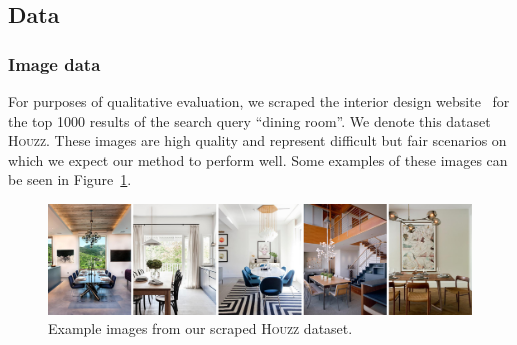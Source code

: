 \documentclass[10pt,twocolumn,letterpaper]{article}
\begin{document}
\begin{table}
    \centering
    \caption[Hyper parameters]{Hyper parameters of optimization, found by HyperOpt~\cite{HyperOpt}}
    \label{tab:ch4:hyperparameters}
\end{table}

\subsection{Data}
\label{sec:ch4:training_data}
\subsubsection{Image data}
For purposes of qualitative evaluation, we scraped the
interior design website~\cite{Houzz} for the top 1000 results of the search
query ``dining room''. We denote this dataset \textsc{Houzz}.  These images are
high quality and represent difficult but fair scenarios on which we expect our
method to perform well. Some examples of these images can be seen in
Figure~\ref{fig:ch4:houzz}.

\begin{figure}
    \includegraphics[width=\linewidth]{figures/houzz_example/houzz_example}
    \caption[Houzz samples]{Example images from our scraped \textsc{Houzz} dataset.}
    \label{fig:ch4:houzz}
\end{figure}
\end{document}
